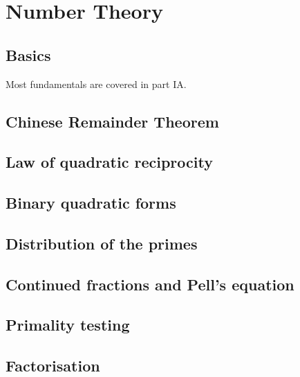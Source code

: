 \documentclass[main.tex]{subfiles}
\begin{document}
\chapter{Number Theory}\label{sec:number-theory}
	\section{Basics}
		Most fundamentals are covered in part IA.
		
	\section{Chinese Remainder Theorem}
		
	\section{Law of quadratic reciprocity}
		
	\section{Binary quadratic forms}
		
	\section{Distribution of the primes}
		
	\section{Continued fractions and Pell's equation}
		
	\section{Primality testing}
		
	\section{Factorisation}		
			
\end{document}
